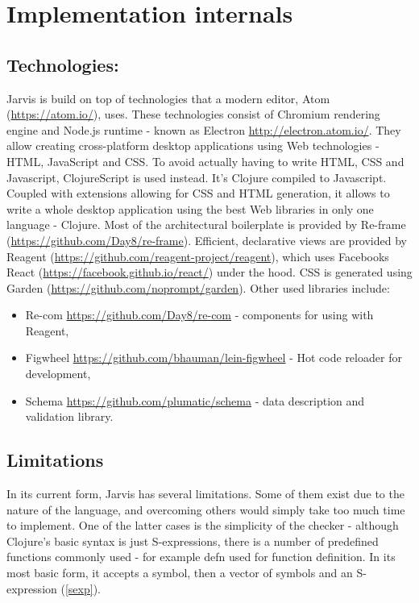 \documentclass[11pt]{scrartcl}
\begin{document}
\section{Implementation internals}
\subsection{Technologies:}
Jarvis is build on top of technologies that a modern editor, Atom (\url{https://atom.io/}), uses. These technologies consist of Chromium rendering engine and Node.js runtime - known as Electron \url{http://electron.atom.io/}. They allow creating cross-platform desktop applications using Web technologies - HTML, JavaScript and CSS. To avoid actually having to write HTML, CSS and Javascript, ClojureScript is used instead. It’s Clojure compiled to Javascript. Coupled with extensions allowing for CSS and HTML generation, it allows to write a whole desktop application using the best Web libraries in only one language - Clojure. 
Most of the architectural boilerplate is provided by Re-frame (\url{https://github.com/Day8/re-frame}). Efficient, declarative views are provided by Reagent (\url{https://github.com/reagent-project/reagent}), which uses Facebooks React (\url{https://facebook.github.io/react/}) under the hood. CSS is generated using Garden (\url{https://github.com/noprompt/garden}). Other used libraries include:
\begin{itemize}
  \item Re-com \url{https://github.com/Day8/re-com} - components for using with Reagent,
  \item Figwheel \url{https://github.com/bhauman/lein-figwheel} - Hot code reloader for development,
  \item Schema \url{https://github.com/plumatic/schema} - data description and validation library.
\end{itemize}

\subsection{Limitations}
In its current form, Jarvis has several limitations. Some of them exist due to the nature of the language, and overcoming others would simply take too much time to implement. One of the latter cases is the simplicity of the checker - although Clojure’s basic syntax is just S-expressions, there is a number of predefined functions commonly used - for example defn used for function definition. In its most basic form, it accepts a symbol, then a vector of symbols and an S-expression (\ref{sexp}).
\end{document}

